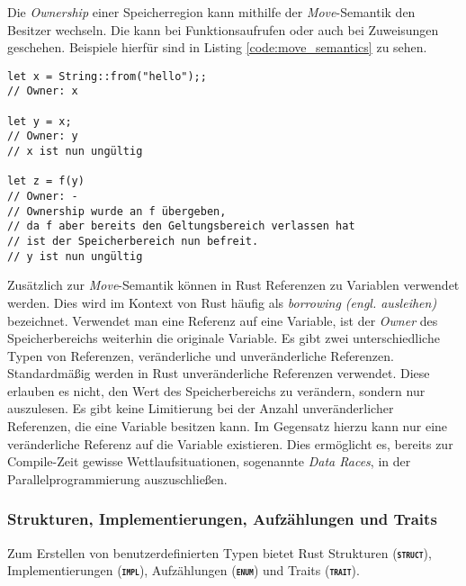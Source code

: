 Die \textit{Ownership} einer Speicherregion kann mithilfe der \textit{Move}-Semantik den Besitzer wechseln.
Die kann bei Funktionsaufrufen oder auch bei Zuweisungen geschehen. Beispiele hierfür sind in Listing
\ref{code:move_semantics} zu sehen.\cite{rustBook}

\begin{lstlisting}[float,caption={Beispieldarstellung der \textit{Move}-Semantik},label=code:move_semantics]
let x = String::from("hello");;
// Owner: x

let y = x;
// Owner: y
// x ist nun ungültig

let z = f(y) 
// Owner: -
// Ownership wurde an f übergeben,
// da f aber bereits den Geltungsbereich verlassen hat
// ist der Speicherbereich nun befreit.
// y ist nun ungültig
\end{lstlisting}

Zusätzlich zur \textit{Move}-Semantik können in Rust Referenzen zu Variablen verwendet werden. Dies wird im Kontext
von Rust häufig als \textit{borrowing (engl. ausleihen)} bezeichnet. Verwendet man eine Referenz auf eine Variable,
ist der \textit{Owner} des Speicherbereichs weiterhin die originale Variable. Es gibt zwei unterschiedliche
Typen von Referenzen, veränderliche und unveränderliche Referenzen. Standardmäßig werden in Rust unveränderliche
Referenzen verwendet. Diese erlauben es nicht, den Wert des Speicherbereichs zu verändern, sondern nur auszulesen.
Es gibt keine Limitierung bei der Anzahl unveränderlicher Referenzen, die eine Variable besitzen kann. Im Gegensatz
hierzu kann nur eine veränderliche Referenz auf die Variable existieren. Dies ermöglicht es, bereits zur
Compile-Zeit gewisse Wettlaufsituationen, sogenannte \textit{Data Races},
in der Parallelprogrammierung auszuschließen.\cite{rustBook}

\subsubsection{Strukturen, Implementierungen, Aufzählungen und Traits}

Zum Erstellen von benutzerdefinierten Typen bietet Rust Strukturen (\texttt{\textsc{\textbf{struct}}}),
Implementierungen (\texttt{\textsc{\textbf{impl}}}), Aufzählungen (\texttt{\textsc{\textbf{enum}}}) und
Traits (\texttt{\textsc{\textbf{trait}}}).


